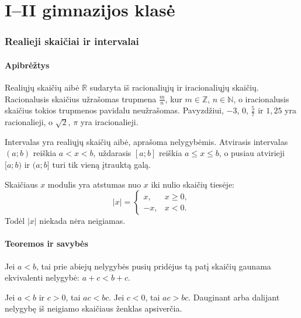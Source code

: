 \part{I--II gimnazijos klasė}

\section{Realieji skaičiai ir intervalai}\label{sec:realieji-skaiciai-ir-intervalai}

\subsection{Apibrėžtys}

\begin{apibreztis}
Realiųjų skaičių aibė $\mathbb{R}$ sudaryta iš racionaliųjų ir iracionaliųjų skaičių. Racionalusis skaičius užrašomas trupmena $\frac{m}{n}$, kur $m\in\mathbb{Z}$, $n\in\mathbb{N}$, o iracionalusis skaičius tokios trupmenos pavidalu neužrašomas. Pavyzdžiui, $-3$, $0$, $\frac{5}{7}$ ir $1,25$ yra racionalieji, o $\sqrt2$, $\pi$ yra iracionalieji.
\end{apibreztis}

\begin{apibreztis}
Intervalas yra realiųjų skaičių aibė, aprašoma nelygybėmis. Atvirasis intervalas $(a;b)$ reiškia $a<x<b$, uždarasis $[a;b]$ reiškia $a\le x\le b$, o pusiau atvirieji $[a;b)$ ir $(a;b]$ turi tik vieną įtrauktą galą.
\end{apibreztis}

\begin{apibreztis}
Skaičiaus $x$ modulis yra atstumas nuo $x$ iki nulio skaičių tiesėje:
\[
|x|=\begin{cases}
x, & x\ge 0,\\
-x, & x<0.
\end{cases}
\]
Todėl $|x|$ niekada nėra neigiamas.
\end{apibreztis}

\subsection{Teoremos ir savybės}

\begin{savybe}
Jei $a<b$, tai prie abiejų nelygybės pusių pridėjus tą patį skaičių gaunama ekvivalenti nelygybė: $a+c<b+c$.
\end{savybe}

\begin{savybe}
Jei $a<b$ ir $c>0$, tai $ac<bc$. Jei $c<0$, tai $ac>bc$. Dauginant arba dalijant nelygybę iš neigiamo skaičiaus ženklas apsiverčia.
\end{savybe}

